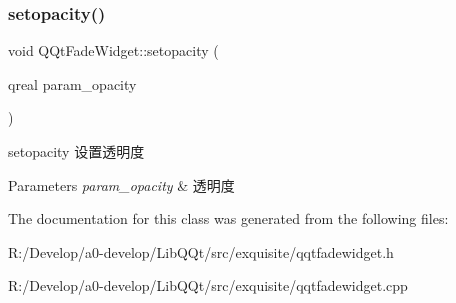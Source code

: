 \subsubsection{\texorpdfstring{setopacity()}{setopacity()}}
{\footnotesize\ttfamily void Q\+Qt\+Fade\+Widget\+::setopacity (\begin{DoxyParamCaption}\item[{qreal}]{param\+\_\+opacity }\end{DoxyParamCaption})}



setopacity 设置透明度 


\begin{DoxyParams}{Parameters}
{\em param\+\_\+opacity} & 透明度 \\
\hline
\end{DoxyParams}


The documentation for this class was generated from the following files\+:\begin{DoxyCompactItemize}
\item 
R\+:/\+Develop/a0-\/develop/\+Lib\+Q\+Qt/src/exquisite/qqtfadewidget.\+h\item 
R\+:/\+Develop/a0-\/develop/\+Lib\+Q\+Qt/src/exquisite/qqtfadewidget.\+cpp\end{DoxyCompactItemize}

